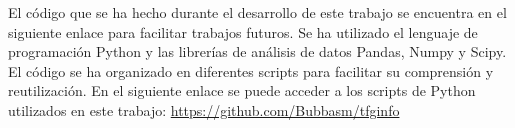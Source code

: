 El código que se ha hecho durante el desarrollo de este trabajo se encuentra en el siguiente enlace para facilitar trabajos futuros. Se ha utilizado el lenguaje de programación Python y las librerías de análisis de datos Pandas, Numpy y Scipy. El código se ha organizado en diferentes scripts para facilitar su comprensión y reutilización. En el siguiente enlace se puede acceder a los scripts de Python utilizados en este trabajo:
\url{
    https://github.com/Bubbasm/tfginfo
}